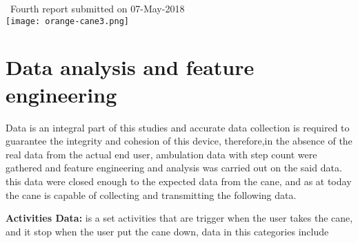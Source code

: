\documentclass[a4paper, parskip=full]{scrartcl}
\begin{document}
\begin{titlepage}
	
	
	{\large \ Fourth report submitted on 07-May-2018}\\[0.2cm] %
	
	
	\texttt{[image: orange-cane3.png]}\\[0.2cm] %
	
	
	\vfill %
	
\end{titlepage}







 \section*{Data analysis and feature engineering}
 
Data is an integral part of this studies and accurate data collection is required to guarantee the integrity and cohesion of this device, therefore,in the absence of the real data from the actual end user, ambulation data with step count were gathered and feature engineering and analysis was carried out on the said data. this data were closed enough to the expected data from the cane, and as at today the cane is capable of collecting and transmitting the following data.

\textbf{Activities Data:} is a set activities that are trigger when the user takes the cane, and it stop when the user put the cane down, data in this categories include 
\end{document}
